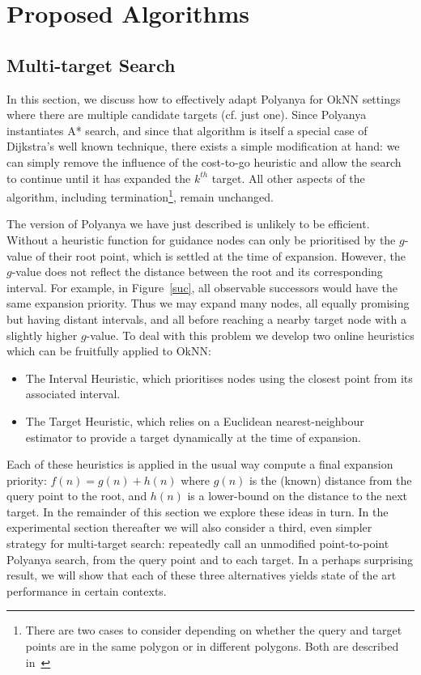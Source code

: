 \chapter{Proposed Algorithms}
\section{Multi-target Search} 
\label{algo}
In this section, we discuss how to effectively adapt Polyanya for OkNN settings where there are multiple
candidate targets (cf. just one). Since Polyanya instantiates A* search, and since that algorithm is itself a special case of Dijkstra's well known technique, there exists a simple modification at hand: we can simply remove the influence of the cost-to-go heuristic and allow the search to continue until it has expanded the $k^{th}$ target. All other aspects of the algorithm, including termination\footnote{There are two cases to consider depending on whether the query and target points are in the same polygon or in different polygons. Both are described in~\cite{cuicompromise}}, remain unchanged.

The version of Polyanya we have just described is unlikely to be efficient. Without a heuristic function for
guidance nodes can only be prioritised by the $g$-value of their root point, 
which is settled at the time of expansion.
However, the $g$-value does not reflect the distance between the root and its corresponding interval. 
For example, in Figure~\ref{suc}, all observable successors would have the same expansion priority.
Thus we may expand many nodes, all equally promising but having distant intervals, and all before reaching a nearby target node with a slightly higher $g$-value.
To deal with this problem we develop two online heuristics which can be fruitfully applied to OkNN:
\begin{itemize}
    \item The Interval Heuristic, which prioritises nodes using the closest point 
    from its associated interval. 
    \item The Target Heuristic, which relies on a Euclidean nearest-neighbour estimator to 
    provide a target dynamically at the time of expansion. 
\end{itemize}
\noindent
Each of these heuristics is applied in the usual way compute a final expansion priority: 
$f(n) = g(n) + h(n)$ where $g(n)$ is the (known) distance from the query point to the root, 
and $h(n)$ is a lower-bound on the distance to the next target. 
In the remainder of this section we explore these ideas in turn.
In the experimental section thereafter we will also consider a third, even simpler strategy for
multi-target search: 
repeatedly call an unmodified point-to-point Polyanya search, from the query point and to 
each target. In a perhaps surprising result, we will show that each of these three alternatives 
yields state of the art performance in certain contexts.

